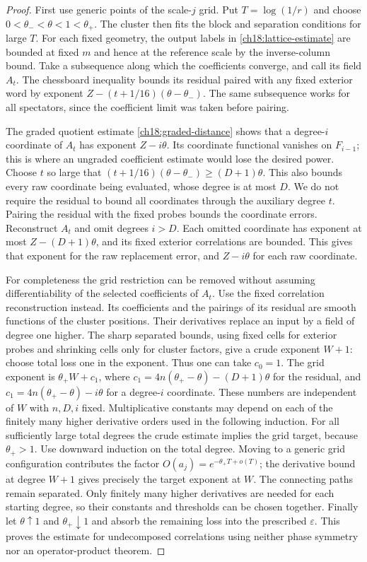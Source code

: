 \begin{proof}
First use generic points of the scale-$j$ grid. Put $T=\log(1/r)$ and
choose $0<\theta_-<\theta<1<\theta_+$. The cluster then fits
the block and separation conditions for large $T$.
For each fixed geometry, the output labels in
\eqref{ch18:lattice-estimate} are bounded at fixed $m$ and hence
at the reference scale by the inverse-column bound. Take a
subsequence along which the coefficients converge, and call its field $A_t$.
The chessboard inequality bounds its residual paired with any
fixed exterior word by exponent
$Z-(t+1/16)(\theta-\theta_-)$. The same subsequence works for all
spectators, since the coefficient limit was taken before pairing.

The graded quotient estimate \eqref{ch18:graded-distance} shows
that a degree-$i$ coordinate of $A_t$ has exponent $Z-i\theta$.
Its coordinate functional vanishes on $F_{i-1}$; this is where
an ungraded coefficient estimate would lose the desired power.
Choose $t$ so large that
$(t+1/16)(\theta-\theta_-)\ge(D+1)\theta$.
This also bounds every raw coordinate being evaluated, whose degree is
at most $D$. We do not require the residual to bound all coordinates
through the auxiliary degree $t$. Pairing the residual
with the fixed probes bounds the coordinate errors. Reconstruct
$A_t$ and omit degrees $i>D$. Each omitted coordinate has exponent
at most $Z-(D+1)\theta$, and its fixed exterior correlations are
bounded. This gives that exponent for the raw replacement error,
and $Z-i\theta$ for each raw coordinate.

For completeness the grid restriction can be removed without
assuming differentiability of the selected coefficients of $A_t$.
Use the fixed correlation reconstruction instead. Its coefficients and
the pairings of its residual are smooth functions of the cluster positions.
Their derivatives replace an input by a field of degree one higher.
The sharp separated bounds, using fixed cells for exterior probes
and shrinking cells only for cluster factors, give a crude exponent
$W+1$: choose total loss one in the exponent. Thus one can take $c_0=1$.
The grid exponent is $\theta_+W+c_1$, where
$c_1=4n(\theta_+-\theta)-(D+1)\theta$ for the residual, and
$c_1=4n(\theta_+-\theta)-i\theta$ for a degree-$i$ coordinate.
These numbers are independent of $W$ with $n,D,i$ fixed.
Multiplicative constants may depend on each of the finitely many
higher derivative orders used in the following induction. For all sufficiently large total
degrees the crude estimate implies the grid target, because
$\theta_+>1$. Use downward induction on the total degree. Moving to a generic grid
configuration contributes the factor $O(a_j)=e^{-\theta_+T+o(T)}$; the derivative
bound at degree $W+1$ gives precisely the target exponent at
$W$. The connecting paths remain separated. Only finitely many
higher derivatives are needed for each starting degree, so their
constants and thresholds can be chosen together. Finally let
$\theta\uparrow1$ and $\theta_+\downarrow1$ and absorb the
remaining loss into the prescribed $\varepsilon$.
This proves the estimate for undecomposed correlations using neither phase symmetry nor
an operator-product theorem.
\end{proof}

